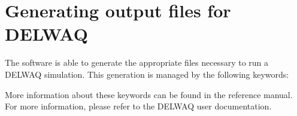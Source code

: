 \chapter{Generating output files for DELWAQ}
\label{tel2d:app4}
 The  software is able to generate the appropriate files necessary to run a DELWAQ simulation. This generation is managed by the following keywords:















 More information about these keywords can be found in the  reference manual. For more information, please refer to the DELWAQ user documentation.
